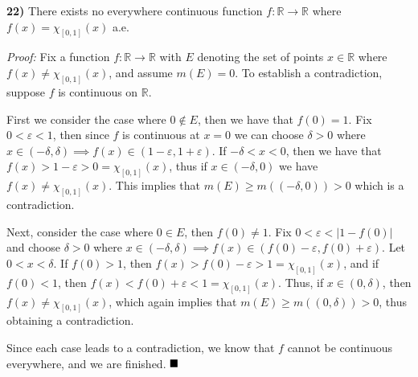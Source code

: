\documentclass[12pt]{article}
\newcommand{\R}{\ensuremath{\mathbb{R}}}
\newcommand{\e}{\ensuremath{\varepsilon}}
\renewcommand{\d}{\ensuremath{\delta}}
\newcommand{\vertb}[1]{\left\vert#1\right\vert}
\newcommand{\proof}{\textit{Proof: }}
\newcommand{\done}{\ensuremath{\strut\hfill\blacksquare}}
\begin{document}
\textbf{22)}
There exists no everywhere continuous function \( f : \R \to \R \) where
\( f(x) = \chi_{[0,1]}(x) \) a.e.

\proof
Fix a function \( f : \R \to \R \) with \( E \) denoting the set of points
\( x \in \R \) where \( f(x) \ne \chi_{[0,1]}(x) \), and assume \( m(E) = 0 \).
To establish a contradiction, suppose \( f \) is continuous on \R.

First we consider the case where \( 0 \notin E \), then we have that
\( f(0) = 1 \).
Fix \( 0 < \e < 1 \), then since \( f \) is continuous at \( x = 0 \) we can
choose \( \d > 0 \) where
\( x \in (-\d,\d) \implies f(x) \in (1 - \e, 1 + \e) \).
If \( -\d < x < 0 \), then we have that
\( f(x) > 1 - \e > 0 = \chi_{[0,1]}(x) \), thus if
\( x \in (-\d,0) \) we have \( f(x) \ne \chi_{[0,1]}(x) \).
This implies that \( m(E) \geq m((-\d,0)) > 0 \) which is a contradiction.

Next, consider the case where \( 0 \in E \), then \( f(0) \ne 1 \).
Fix \( 0 < \e < \vertb{1 - f(0)} \) and choose \( \d > 0 \)
where \( x \in (-\d,\d) \implies f(x) \in (f(0) - \e, f(0) + \e) \).
Let \( 0 < x < \d \).
If \( f(0) > 1 \), then \( f(x) > f(0) - \e > 1 = \chi_{[0,1]}(x) \), and if
\( f(0) < 1 \), then \( f(x) < f(0) + \e < 1 = \chi_{[0,1]}(x) \).
Thus, if \( x \in (0, \d) \), then \( f(x) \ne \chi_{[0,1]}(x) \), which again
implies that \( m(E) \geq m((0,\d)) > 0 \), thus obtaining a contradiction.

Since each case leads to a contradiction, we know that \( f \) cannot be
continuous everywhere, and we are finished.
\done

{}
\end{document}
